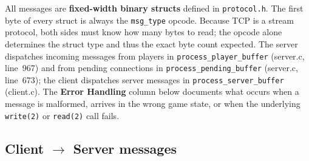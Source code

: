 \documentclass[11pt,letterpaper]{article}
\begin{document}
All messages are \textbf{fixed-width binary structs} defined in \texttt{protocol.h}. The first byte of every struct is always the \texttt{msg\_type} opcode. Because TCP is a stream protocol, both sides must know how many bytes to read; the opcode alone determines the struct type and thus the exact byte count expected. The server dispatches incoming messages from players in \texttt{process\_player\_buffer} (server.c, line~967) and from pending connections in \texttt{process\_pending\_buffer} (server.c, line~673); the client dispatches server messages in \texttt{process\_server\_buffer} (client.c). The \textbf{Error Handling} column below documents what occurs when a message is malformed, arrives in the wrong game state, or when the underlying \texttt{write(2)} or \texttt{read(2)} call fails.

\subsection*{Client $\to$ Server messages}
\end{document}
